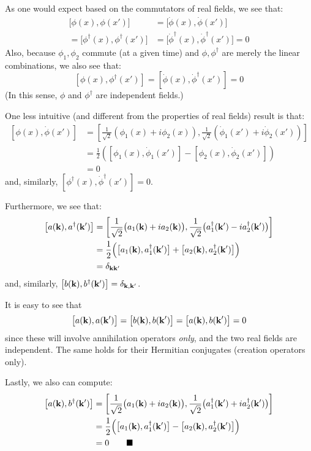 \documentclass[letterpaper,12pt]{article}
\newenvironment{problem}{\subsection{}\begin{adjustwidth}{0.25in}{}\vspace{-\baselineskip}}{\end{adjustwidth}}
\newcommand{\done}{\tag*{$\blacksquare$}}
\begin{document}
\begin{problem}
As one would expect based on the commutators of real fields, we see that:
\begin{align*}
	\big[\phi(x), \phi(x')\big] &= \big[\dot{\phi}(x), \dot{\phi}(x')\big]	\\
	= \big[\phi^\dagger(x), \phi^\dagger(x')\big] &= \big[\dot{\phi}^\dagger(x), \dot{\phi}^\dagger(x')\big] = 0
\end{align*}
Also, because $\phi_1, \phi_2$ commute (at a given time) and $\phi, \phi^\dagger$ are merely the linear combinations, we also see that:
\begin{equation*}
	\left[\phi(x), \phi^\dagger(x')\right] = \left[\dot{\phi}(x), \dot{\phi}^\dagger(x')\right] = 0
\end{equation*}
(In this sense, $\phi$ and $\phi^\dagger$ are independent fields.)

One less intuitive (and different from the properties of real fields) result is that:
\begin{align*}
	\left[\phi(x), \dot{\phi}(x')\right]
	&= \left[\frac{1}{\sqrt{2}}\left(\phi_1(x)+i\phi_2(x)\right), \frac{1}{\sqrt{2}}\left(\dot{\phi}_1(x') + i\dot{\phi}_2(x')\right)\right]	\\
	&= \frac{1}{2} \left(\left[\phi_1(x), \dot{\phi}_1(x')\right] - \left[\phi_2(x), \dot{\phi}_2(x')\right]\right)	\\
	&= 0
\end{align*}
and, similarly, $\left[\phi^\dagger(x), \dot{\phi}^\dagger(x')\right]=0$.

Furthermore, we see that:
\begin{align*}
	\left[a(\vb{k}), a^\dagger(\vb{k}')\right]
	&= \left[\frac{1}{\sqrt{2}}\big(a_1(\vb{k}) + ia_2(\vb{k})\big), \frac{1}{\sqrt{2}}\big(a^\dagger_1(\vb{k}')-ia^\dagger_2(\vb{k}')\big)\right]	\\
	&= \frac{1}{2}\Big(\big[a_1(\vb{k}), a^\dagger_1(\vb{k}')\big] + \big[a_2(\vb{k}), a^\dagger_2(\vb{k}')\big]\Big)	\\
	&= \delta_{\vb{k}\vb{k}'}
\end{align*}
and, similarly, $\left[b(\vb{k}), b^\dagger(\vb{k}')\right] = \delta_{\vb{k}, \vb{k}'}$.

It is easy to see that
\begin{equation*}
	\big[a(\vb{k}), a(\vb{k}')\big] = \big[b(\vb{k}), b(\vb{k}')\big] = \big[a(\vb{k}), b(\vb{k}')\big] = 0
\end{equation*}
since these will involve annihilation operators \emph{only}, and the two real fields are independent. The same holds for their Hermitian conjugates (creation operators only).

Lastly, we also can compute:
\begin{align*}
	\big[a(\vb{k}), b^\dagger(\vb{k}')\big]
	&= \left[\frac{1}{\sqrt{2}}\big(a_1(\vb{k}) + ia_2(\vb{k})\big), \frac{1}{\sqrt{2}}\big(a^\dagger_1(\vb{k}') + ia^\dagger_2(\vb{k}')\big)\right]	\\
	&= \frac{1}{2}\Big(\big[a_1(\vb{k}), a^\dagger_1(\vb{k}')\big] - \big[a_2(\vb{k}), a^\dagger_2(\vb{k}')\big]\Big)	\\
	&= 0		\done
\end{align*}
\end{problem}
\end{document}
